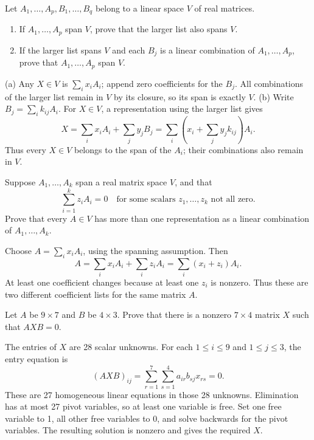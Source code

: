 \begin{problem}\label{ex:02:generators}
Let $A_1,\ldots,A_p,B_1,\ldots,B_q$ belong to a linear space $V$ of real matrices.
\begin{enumerate}
\item If $A_1,\ldots,A_p$ span $V$, prove that the larger list also spans $V$.
\item If the larger list spans $V$ and each $B_j$ is a linear combination of
$A_1,\ldots,A_p$, prove that $A_1,\ldots,A_p$ span $V$.
\end{enumerate}
\end{problem}
\begin{solution}
(a) Any $X\in V$ is $\sum_i x_iA_i$; append zero coefficients for the $B_j$.
All combinations of the larger list remain in $V$ by its closure, so its span is exactly $V$.
(b) Write $B_j=\sum_i k_{ij}A_i$. For $X\in V$, a representation using the larger list gives
\[
X=\sum_i x_iA_i+\sum_j y_jB_j
 =\sum_i\left(x_i+\sum_j y_jk_{ij}\right)A_i.
\]
Thus every $X\in V$ belongs to the span of the $A_i$; their combinations also remain in $V$.
\end{solution}

\begin{problem}\label{ex:02:nonunique-coefficients}
Suppose $A_1,\ldots,A_k$ span a real matrix space $V$, and that
\[
\sum_{i=1}^k z_iA_i=0
\quad\text{for some scalars }z_1,\ldots,z_k\text{ not all zero}.
\]
Prove that every $A\in V$ has more than one representation as a linear combination
of $A_1,\ldots,A_k$.
\end{problem}
\begin{solution}
Choose $A=\sum_i x_iA_i$, using the spanning assumption. Then
\[
A=\sum_i x_iA_i+\sum_i z_iA_i=\sum_i(x_i+z_i)A_i.
\]
At least one coefficient changes because at least one $z_i$ is nonzero.
Thus these are two different coefficient lists for the same matrix $A$.
\end{solution}

\begin{problem}\label{ex:02:bapat-2-16}
Let $A$ be $9\times7$ and $B$ be $4\times3$. Prove that there is a nonzero
$7\times4$ matrix $X$ such that $AXB=0$.
\end{problem}
\begin{solution}
The entries of $X$ are 28 scalar unknowns. For each $1\leqslant i\leqslant9$
and $1\leqslant j\leqslant3$, the entry equation is
\[
(AXB)_{ij}=\sum_{r=1}^7\sum_{s=1}^4 a_{ir}b_{sj}x_{rs}=0.
\]
These are 27 homogeneous linear equations in those 28 unknowns.
Elimination has at most 27 pivot variables, so at least one variable is free.
Set one free variable to 1, all other free variables to 0, and solve backwards
for the pivot variables. The resulting solution is nonzero and gives the required $X$.
\end{solution}

